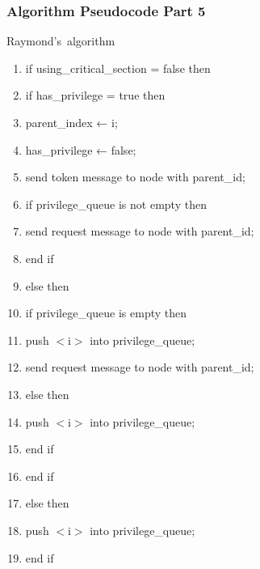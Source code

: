 \documentclass[11pt]{beamer}              %
\begin{document}
\begin{frame}
\frametitle{Algorithm Pseudocode Part 5}

\begin{center}
\begin{algorithm}[H]
	\scriptsize
	\def\algorithmlabel{Raymond's}
    \caption{\algorithmlabel\ algorithm}
    \label{alg:raymondsalgorithm}
    \begin{algorithmic}[1]
            \begin{enumerate}
                \item if using\_critical\_section = false then
                \item \quad if has\_privilege = true then
                \item \quad \quad parent\_index ← i;
                \item \quad \quad has\_privilege ← false;
                \item \quad \quad send token message to node with parent\_id;
                \item \quad \quad if privilege\_queue is not empty then
                \item \quad \quad \quad send request message to node with parent\_id;
                \item \quad \quad end if
                \item \quad else then
                \item \quad \quad if privilege\_queue is empty then
                \item \quad \quad \quad push $<$i$>$ into privilege\_queue;
                \item \quad \quad \quad send request message to node with parent\_id;
                \item \quad \quad else then
                \item \quad \quad \quad push $<$i$>$ into privilege\_queue;
                \item \quad \quad end if
                \item \quad end if
                \item else then
                \item \quad push $<$i$>$ into privilege\_queue;
                \item end if
            \end{enumerate}

    \end{algorithmic}
\end{algorithm}
\end{center}
\end{frame}
\end{document}
